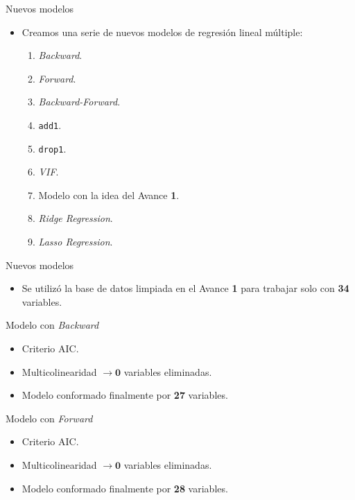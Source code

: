\documentclass[11pt]{beamer}
\newcommand{\cod}[1]{\texttt{\frenchspacing#1}}
\begin{document}
\begin{frame}{Nuevos modelos}
	\begin{itemize}
		\item Creamos una serie de nuevos modelos de regresión lineal múltiple:
		\begin{enumerate}
			\item \textit{Backward}.
			\pause
			\item \textit{Forward}.
			\pause
			\item \textit{Backward-Forward}.
			\pause
			\item \cod{add1}.
			\pause
			\item \cod{drop1}.
			\pause
			\item \textit{VIF}.
			\pause
			\item Modelo con la idea del Avance \textbf{1}.
			\pause
			\item \textit{Ridge Regression}.
			\pause
			\item \textit{Lasso Regression}.
		\end{enumerate}
	\end{itemize}
\end{frame}

\begin{frame}{Nuevos modelos}
	\begin{itemize}
		\item Se utilizó la base de datos limpiada en el Avance \textbf{1} para trabajar solo con \textbf{34} variables.
	\end{itemize}
\end{frame}

\begin{frame}{Modelo con \textit{Backward}}
	\begin{itemize}
		\item Criterio AIC.
		\item Multicolinearidad $\to \mathbf{0}$ variables eliminadas.
		\item Modelo conformado finalmente por \textbf{27} variables.
	\end{itemize}
\end{frame}

\begin{frame}{Modelo con \textit{Forward}}
	\begin{itemize}
		\item Criterio AIC.
		\item Multicolinearidad $\to \mathbf{0}$ variables eliminadas.
		\item Modelo conformado finalmente por \textbf{28} variables.
	\end{itemize}
\end{frame}
\end{document}
